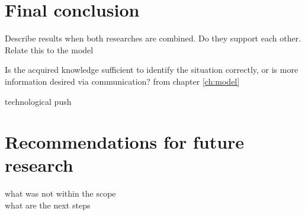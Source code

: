 \chapter{Final conclusion}
Describe results when both researches are combined. Do they support each other. Relate this to the model

Is the acquired knowledge sufficient to identify the situation correctly, or is more information desired via communication? from chapter \ref{ch:model}

technological push


\chapter{Recommendations for future research}
what was not within the scope \\
what are the next steps
